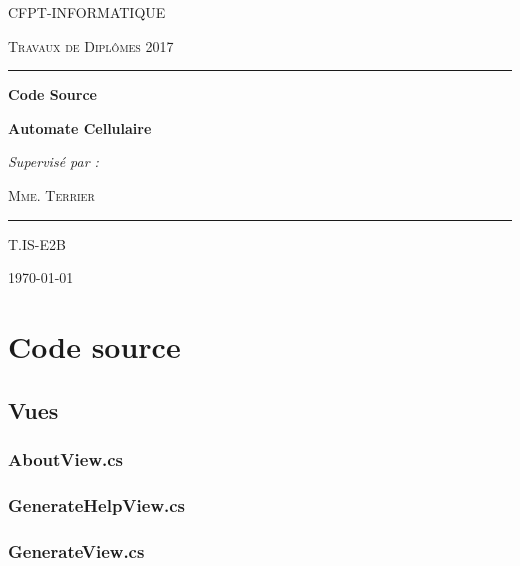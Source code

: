\documentclass[a4paper, french]{article}
\newcommand{\subtitle}{Automate Cellulaire}
\newcommand{\lesson}{Travaux de Diplômes 2017}
\newcommand{\class}{T.IS-E2B}
\newcommand{\teacher}{Mme. Terrier}
\begin{document}
\pagebreak
\listoffigures
\listoftables

\pagebreak

\pagebreak
\begin{center}
	{\scshape\LARGE CFPT-INFORMATIQUE \par}
	\vspace{0.25cm}
	{\scshape\lesson\par}
	\vspace{3cm}
	
	\hrule
	{\huge\bfseries\textsc{}Code Source\par}
	{\Large\bfseries\textsc\subtitle\par}
	\vspace{0.5cm}
	{\itshape\@author\par}
	\vspace{1cm}
	{\textit{Supervisé par :}  \par \textsc{\teacher}}\par
	\vspace{0.5cm}
	\hrule
	
	\vfill

	\vfill
	\textsc{\class}
	\vspace{1cm}
	
	{\large\today\par}
\end{center}
\pagebreak

\section{Code source}
\subsection{Vues}
\subsubsection{AboutView.cs}


\subsubsection{GenerateHelpView.cs}


\subsubsection{GenerateView.cs}

\end{document}
